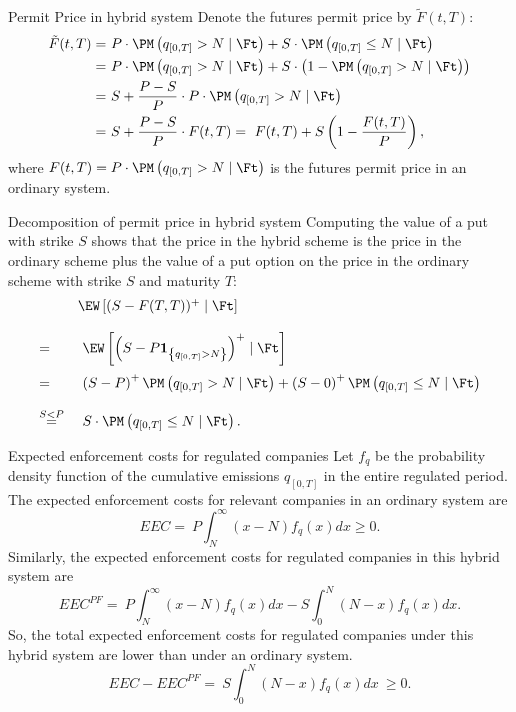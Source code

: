 Permit Price in hybrid system
	Denote the futures permit price by $\tilde{F}(t,T)$:
		\begin{align*}
		\tilde{F}(t,T) =& \ P \cdot \PM \left( q_{[0,T]} > N \mid \Ft \right) + S \cdot \PM \left( q_{[0,T]} \le N \mid \Ft \right) \\
			=& \ P \cdot \PM \left( q_{[0,T]} > N \mid \Ft \right) + S \cdot \left( 1 - \PM \left( q_{[0,T]} > N \mid \Ft \right)\right) \\
			=& \ S + \frac{P-S}{P} \cdot P \cdot \PM \left( q_{[0,T]} > N \mid \Ft \right) \\
			=& \ S + \frac{P-S}{P} \cdot F(t,T) = \ F(t,T) + S\left(1 - \frac{F(t,T)}{P}\right),
		\end{align*}
	where $F(t,T) = P \cdot \PM \left( q_{[0,T]} > N \mid \Ft \right)$ is the futures permit price in an ordinary system.


Decomposition of permit price in hybrid system
	Computing the value of a put with strike $S$ shows that the price in the hybrid scheme is the price in the ordinary 
	scheme plus the value of a put option on the price in the ordinary scheme with strike $S$ and maturity $T$:
		$$
		\begin{array}{ll}
		&\EW\left[ (S-F(T,T))^+ \mid \Ft \right]\\*[12pt]
		=& \ \EW\left[ \left( S- P \textbf{1}_{\left\{ q_{[0,T]} > N \right\}} \right)^+ \mid \Ft \right] \\*[12pt]
		=& \ \left( S- P \right)^+ \PM \left( q_{[0,T]} > N \mid \Ft \right) + \left( S- 0 \right)^+ \PM \left( q_{[0,T]} \le N \mid \Ft \right) \\*[12pt]
		 \stackrel{S<P}{=}& \ S \cdot \PM \left( q_{[0,T]} \le N \mid \Ft \right).
		\end{array}
		$$


Expected enforcement costs for regulated companies
	Let $f_q$ be the probability density function of the cumulative emissions $q_{[0,T]}$ in the entire regulated period. The expected enforcement costs for relevant companies in an ordinary system are
		$$
		EEC = \ P \int_N^{\infty} (x-N) f_q(x) dx \ge 0.
		$$
	Similarly, the expected enforcement costs for regulated companies in this hybrid system are
		$$
		EEC^{PF} = \ P \int_N^{\infty} (x-N) f_q(x) dx - S \int_0^N (N-x) f_q(x) dx.
		$$
	So, the total expected enforcement costs for regulated companies under this hybrid system are lower than under an ordinary system.
		$$
		EEC - EEC^{PF} = \ S \int_0^N (N-x) f_q(x) dx \ \ge 0.
		$$


